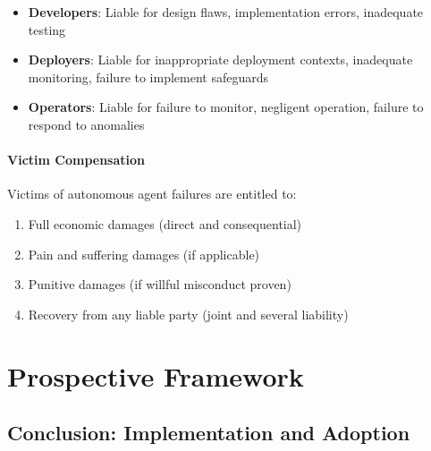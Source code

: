 \documentclass[12pt,a4paper,twoside,openright]{book}
\begin{document}
\begin{itemize}
    \item \textbf{Developers}: Liable for design flaws, implementation errors, inadequate testing
    \item \textbf{Deployers}: Liable for inappropriate deployment contexts, inadequate monitoring, failure to implement safeguards
    \item \textbf{Operators}: Liable for failure to monitor, negligent operation, failure to respond to anomalies
\end{itemize}

\subsection{Victim Compensation}

Victims of autonomous agent failures are entitled to:

\begin{enumerate}
    \item Full economic damages (direct and consequential)
    \item Pain and suffering damages (if applicable)
    \item Punitive damages (if willful misconduct proven)
    \item Recovery from any liable party (joint and several liability)
\end{enumerate}









\part{Prospective Framework}












\chapter{Conclusion: Implementation and Adoption}
\end{document}
